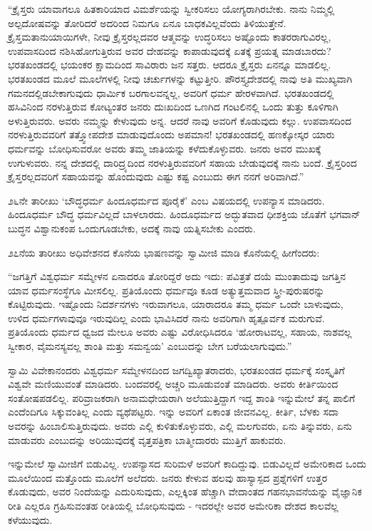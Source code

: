  “ಕ್ರೈಸ್ತರು ಯಾವಾಗಲೂ ಹಿತಕಾರಿಯಾದ ವಿಮರ್ಶೆಯನ್ನು ಸ್ವೀಕರಿಸಲು ಯೋಗ್ಯರಾಗಿರಬೇಕು. ನಾನು ನಿಮ್ಮಲ್ಲಿ ಅಲ್ಪದೋಷವನ್ನು ತೋರಿದರೆ ಅದರಿಂದ ನಿಮಗೂ ಏನೂ ಬಾಧಕವಿಲ್ಲವೆಂದು ತಿಳಿಯುತ್ತೇನೆ. ಕ್ರೈಸ್ತಮತಾನುಯಾಯಿಗಳೇ, ನೀವು ಕ್ರೈಸ್ತರಲ್ಲದವರ ಆತ್ಮವನ್ನು ಉದ್ಧರಿಸಲು ಅಷ್ಟೊಂದು ಕಾತರರಾಗುವಿರಲ್ಲ, ಉಪವಾಸದಿಂದ ನಶಿಸಿಹೋಗುತ್ತಿರುವ ಅವರ ದೇಹವನ್ನು ಕಾಪಾಡುವುದಕ್ಕೆ ಏತಕ್ಕೆ ಪ್ರಯತ್ನ ಮಾಡಬಾರದು? ಭರತಖಂಡದಲ್ಲಿ ಭಯಂಕರ ಕ್ಷಾಮದಿಂದ ಸಾವಿರಾರು ಜನ ಸತ್ತರು. ಆದರೂ ಕ್ರೈಸ್ತರು ಏನನ್ನೂ ಮಾಡಲಿಲ್ಲ. ಭರತಖಂಡದ ಮೂಲೆ ಮೂಲೆಗಳಲ್ಲಿ ನೀವು ಚರ್ಚುಗಳನ್ನು ಕಟ್ಟುತ್ತೀರಿ. ಪೌರಸ್ತ್ಯದೇಶದಲ್ಲಿ ನಾವು ಅತಿ ಮುಖ್ಯವಾಗಿ ಗಮನದಲ್ಲಿಡಬೇಕಾಗುವುದು ಧಾರ್ಮಿಕ ಬರಗಾಲವನ್ನಲ್ಲ, ಅವರಿಗೆ ಧರ್ಮ ಹೇರಳವಾಗಿದೆ. ಭರತಖಂಡದಲ್ಲಿ ಹಸಿವಿನಿಂದ ನರಳುತ್ತಿರುವ ಕೋಟ್ಯಂತರ ಜನರು ದುಃಖದಿಂದ ಒಣಗಿದ ಗಂಟಲಿನಲ್ಲಿ ಒಂದು ತುತ್ತು ಕೂಳಿಗಾಗಿ ಅಳುತ್ತಿರುವರು. ಅವರು ನಮ್ಮನ್ನು ಕೇಳುವುದು ಅನ್ನ. ಆದರೆ ನಾವು ಅವರಿಗೆ ಕೊಡುವುದು ಕಲ್ಲು. ಉಪವಾಸದಿಂದ ನರಳುತ್ತಿರುವವರಿಗೆ ತತ್ತ್ವೋಪದೇಶ ಮಾಡುವುದೊಂದು ಅಪಮಾನ! ಭರತಖಂಡದಲ್ಲಿ ಹಣಕ್ಕೋಸ್ಕರ ಯಾರು ಧರ್ಮವನ್ನು ಬೋಧಿಸುವರೋ ಅವರು ತಮ್ಮ ಜಾತಿಯನ್ನು ಕಳೆದುಕೊಳ್ಳುವರು. ಜನರು ಅವರ ಮುಖಕ್ಕೆ ಉಗುಳುವರು. ನನ್ನ ದೇಶದಲ್ಲಿ ದಾರಿದ್ರ್ಯದಿಂದ ನರಳುತ್ತಿರುವವರಿಗೆ ಸಹಾಯ ಬೇಡುವುದಕ್ಕೆ ನಾನು ಬಂದೆ. ಕ್ರೈಸ್ತರಿಂದ ಕ್ರೈಸ್ತರಲ್ಲದವರಿಗೆ ಸಹಾಯವನ್ನು ಹೊಂದುವುದು ಎಷ್ಟು ಕಷ್ಟ ಎಂಬುದು ಈಗ ನನಗೆ ಅರಿವಾಗಿದೆ.” 

 ೨೬ನೇ ತಾರೀಖು ‘ಬೌದ್ಧಧರ್ಮ ಹಿಂದೂಧರ್ಮದ ಪೂರೈಕೆ’ ಎಂಬ ವಿಷಯದಲ್ಲಿ ಉಪನ್ಯಾಸ ಮಾಡಿದರು. ಹಿಂದೂಧರ್ಮ ಬೌದ್ಧ ಧರ್ಮವಿಲ್ಲದೆ ಬಾಳಲಾರದು. ಹಿಂದೂಧರ್ಮದ ಅದ್ಭುತವಾದ ಧೀಶಕ್ತಿಯ ಜೊತೆಗೆ ಭಗವಾನ್ ಬುದ್ಧನ ವಿಶ್ವಾನುಕಂಪ ಒಂದುಗೂಡಬೇಕು, ಅದಕ್ಕೆ ನಾವು ಯತ್ನಿಸಬೇಕು ಎಂದರು. 

 ೨೭ನೆಯ ತಾರೀಖು ಅಧಿವೇಶನದ ಕೊನೆಯ ಭಾಷಣವನ್ನು ಸ್ವಾಮೀಜಿ ಮಾಡಿ ಕೊನೆಯಲ್ಲಿ ಹೀಗೆಂದರು: 

 “ಜಗತ್ತಿಗೆ ವಿಶ್ವಧರ್ಮ ಸಮ್ಮೇಳನ ಏನಾದರೂ ತೋರಿದ್ದರೆ ಅದು ಇದು: ಪವಿತ್ರತೆ ದಯೆ ಮುಂತಾದುವು ಜಗತ್ತಿನ ಯಾವ ಧರ್ಮಸಂಸ್ಥೆಗೂ ಮೀಸಲಿಲ್ಲ. ಪ್ರತಿಯೊಂದು ಧರ್ಮವೂ ಕೂಡ ಅತ್ಯುತ್ತಮವಾದ ಸ್ತ್ರೀ-ಪುರುಷರನ್ನು ಕೊಟ್ಟಿರುವುದು. ಇಷ್ಟೊಂದು ನಿದರ್ಶನಗಳು ಇರುವಾಗಲೂ, ಯಾರಾದರೂ ತಮ್ಮ ಧರ್ಮ ಒಂದೇ ಬಾಳುವುದು, ಉಳಿದ ಧರ್ಮಗಳಾವುವೂ ಇರುವುದಿಲ್ಲ ಎಂದು ಭಾವಿಸಿದರೆ ನಾನು ಅವರಿಗಾಗಿ ಹೃತ್ಪೂರ್ವಕ ಮರುಗುವೆ. ಪ್ರತಿಯೊಂದು ಧರ್ಮದ ಧ್ವಜದ ಮೇಲೂ ಅವರು ಎಷ್ಟು ವಿರೋಧಿಸಿದರೂ ‘ಹೋರಾಟವಲ್ಲ, ಸಹಾಯ, ನಾಶವಲ್ಲ ಸ್ವೀಕಾರ, ವೈಮನಸ್ಯವಲ್ಲ ಶಾಂತಿ ಮತ್ತು ಸಮನ್ವಯ’ ಎಂಬುದನ್ನು ಬೇಗ ಬರೆಯಲಾಗುವುದು.” 

 ಸ್ವಾಮಿ ವಿವೇಕಾನಂದರು ವಿಶ್ವಧರ್ಮ ಸಮ್ಮೇಳನದಿಂದ ಜಗದ್ವಿಖ್ಯಾತರಾದರು, ಭರತಖಂಡದ ಧರ್ಮಕ್ಕೆ ಸಂಸ್ಕೃತಿಗೆ ವಿಶ್ವವೇ ಮಣಿಯುವಂತೆ ಮಾಡಿದರು. ಬಂದವರಲ್ಲಿ ಅಚ್ಚರಿ ಮೂಡುವಂತೆ ಮಾಡಿದರು. ಅವರು ಕೀರ್ತಿಯಿಂದ ಸಂತೋಷಪಡಲಿಲ್ಲ. ಪರಿವ್ರಾಜಕರಾಗಿ ಅನಾಮಧೇಯರಾಗಿ ಅಲೆಯುತ್ತಿದ್ದಾಗ ಇದ್ದ ಶಾಂತಿ ಇನ್ನುಮೇಲೆ ತನ್ನ ಪಾಲಿಗೆ ಎಂದೆಂದಿಗೂ ಸಿಕ್ಕುವಂತಿಲ್ಲ ಎಂದು ವ್ಯಥೆಪಟ್ಟರು. ಇನ್ನು ಅವರಿಗೆ ಏಕಾಂತ ಜೀವನವಿಲ್ಲ. ಕೀರ್ತಿ, ಬೆಳಕು ಸದಾ ಅವರನ್ನು ಹಿಂಬಾಲಿಸುತ್ತಿರುವುದು. ಅವರು ಎಲ್ಲಿ ಕುಳಿತುಕೊಳ್ಳುವರು, ಎಲ್ಲಿ ಮಲಗುವರು, ಏನು ತಿನ್ನುವರು, ಏನು ಮಾಡುವರು ಎಂಬುದನ್ನು ಅರಿಯುವುದಕ್ಕೆ ವೃತ್ತಪತ್ರಿಕಾ ಬಾತ್ಮೀದಾರರು ಮುತ್ತಿಗೆ ಹಾಕುವರು. 

 ಇನ್ನುಮೇಲೆ ಸ್ವಾಮೀಜಿಗೆ ಬಿಡುವಿಲ್ಲ. ಉಪನ್ಯಾಸದ ಸುರಿಮಳೆ ಅವರಿಗೆ ಕಾದಿದ್ದುವು. ಬಿಡುವಿಲ್ಲದೆ ಅಮೇರಿಕಾದ ಒಂದು ಮೂಲೆಯಿಂದ ಮತ್ತೊಂದು ಮೂಲೆಗೆ ಅಲೆದರು. ಜನರು ಕೇಳುವ ಹಲವು ಹಾಸ್ಯಾಸ್ಪದ ಪ್ರಶ್ನೆಗಳಿಗೆ ಉತ್ತರ ಕೊಡುವುದು, ಅವರ ನಿಂದೆಯನ್ನು ಎದುರಿಸುವುದು, ಎಲ್ಲಕ್ಕಿಂತ ಹೆಚ್ಚಾಗಿ ವೇದಾಂತದ ಗಹನಭಾವನೆಯನ್ನು ವೈಜ್ಞಾನಿಕ ರೀತಿ ಎಲ್ಲರೂ ಗ್ರಹಿಸುವಂತಹ ರೀತಿಯಲ್ಲಿ ಬೋಧಿಸುವುದು - ಇದರಲ್ಲೇ ಅವರ ಅಮೇರಿಕಾ ದೇಶದ ಕಾಲವೆಲ್ಲ ಕಳೆಯುವುದು. 


